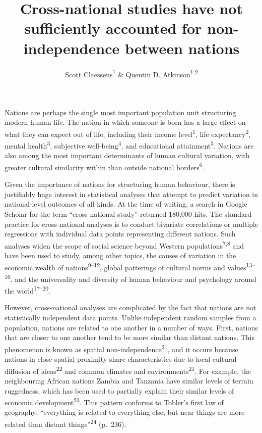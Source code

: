 \documentclass[
  english,
  man,floatsintext]{apa6}
\title{Cross-national studies have not sufficiently accounted for non-independence between nations}
\author{Scott Claessens\textsuperscript{1} \& Quentin D. Atkinson\textsuperscript{1,2}}
\date{}
\affiliation{\vspace{0.5cm}\textsuperscript{1} School of Psychology, University of Auckland, Auckland, New Zealand\\\textsuperscript{2} Max Planck Institute for the Science of Human History, Jena, Germany}
\begin{document}
\maketitle

Nations are perhaps the single most important population unit structuring modern human life. The nation in which someone is born has a large effect on what they can expect out of life, including their income level\textsuperscript{1}, life expectancy\textsuperscript{2}, mental health\textsuperscript{3}, subjective well-being\textsuperscript{4}, and educational attainment\textsuperscript{5}. Nations are also among the most important determinants of human cultural variation, with greater cultural similarity within than outside national borders\textsuperscript{6}.

Given the importance of nations for structuring human behaviour, there is justifiably huge interest in statistical analyses that attempt to predict variation in national-level outcomes of all kinds. At the time of writing, a search in Google Scholar for the term \enquote{cross-national study} returned 180,000 hits. The standard practice for cross-national analyses is to conduct bivariate correlations or multiple regressions with individual data points representing different nations. Such analyses widen the scope of social science beyond Western populations\textsuperscript{7,8} and have been used to study, among other topics, the causes of variation in the economic wealth of nations\textsuperscript{9--12}, global patterings of cultural norms and values\textsuperscript{13--16}, and the universality and diversity of human behaviour and psychology around the world\textsuperscript{17--20}.

However, cross-national analyses are complicated by the fact that nations are not statistically independent data points. Unlike independent random samples from a population, nations are related to one another in a number of ways. First, nations that are closer to one another tend to be more similar than distant nations. This phenomenon is known as spatial non-independence\textsuperscript{21}, and it occurs because nations in close spatial proximity share characteristics due to local cultural diffusion of ideas\textsuperscript{22} and common climates and environments\textsuperscript{21}. For example, the neighbouring African nations Zambia and Tanzania have similar levels of terrain ruggedness, which has been used to partially explain their similar levels of economic development\textsuperscript{23}. This pattern conforms to Tobler's first law of geography: \enquote{everything is related to everything else, but near things are more related than distant things}\textsuperscript{24} (p.~236).
\end{document}
